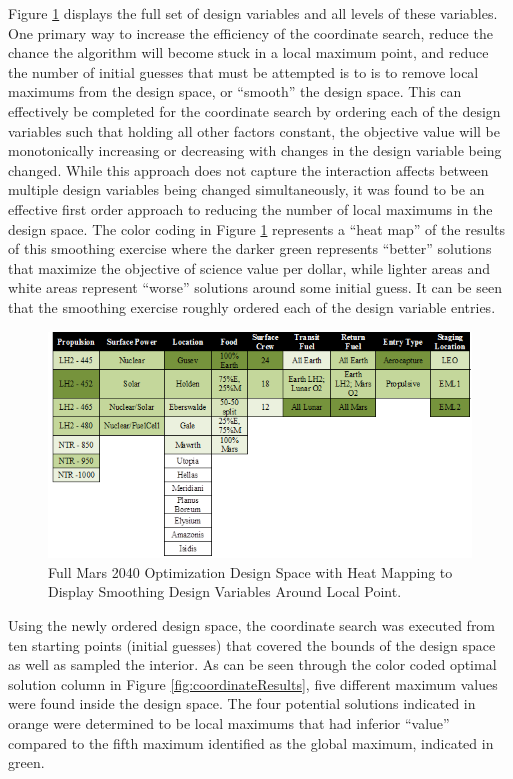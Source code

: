 \documentclass[]{aiaa-pretty}
\begin{document}
Figure \ref{fig:heatmap} displays the full set of design variables and all levels of these variables. One primary way to increase the efficiency of the coordinate search, reduce the chance the algorithm will become stuck in a local maximum point, and reduce the number of initial guesses that must be attempted is to is to remove local maximums from the design space, or “smooth” the design space. This can effectively be completed for the coordinate search by ordering each of the design variables such that holding all other factors constant, the objective value will be monotonically increasing or decreasing with changes in the design variable being changed. While this approach does not capture the interaction affects between multiple design variables being changed simultaneously, it was found to be an effective first order approach to reducing the number of local maximums in the design space. The color coding in Figure \ref{fig:heatmap} represents a “heat map” of the results of this smoothing exercise where the darker green represents “better” solutions that maximize the objective of science value per dollar, while lighter areas and white areas represent “worse” solutions around some initial guess. It can be seen that the smoothing exercise roughly ordered each of the design variable entries.

\begin{figure}[ht!]
	\centering
	\includegraphics[width=1\textwidth]{DesignSpaceHeatMap2}
	\caption{Full Mars 2040 Optimization Design Space with Heat Mapping to Display Smoothing Design Variables Around Local Point.}
	\label{fig:heatmap}
\end{figure}

Using the newly ordered design space, the coordinate search was executed from ten starting points (initial guesses) that covered the bounds of the design space as well as sampled the interior. As can be seen through the color coded optimal solution column in Figure \ref{fig:coordinateResults}, five different maximum values were found inside the design space. The four potential solutions indicated in orange were determined to be local maximums that had inferior ``value'' compared to the fifth maximum identified as the global maximum, indicated in green.
\end{document}
